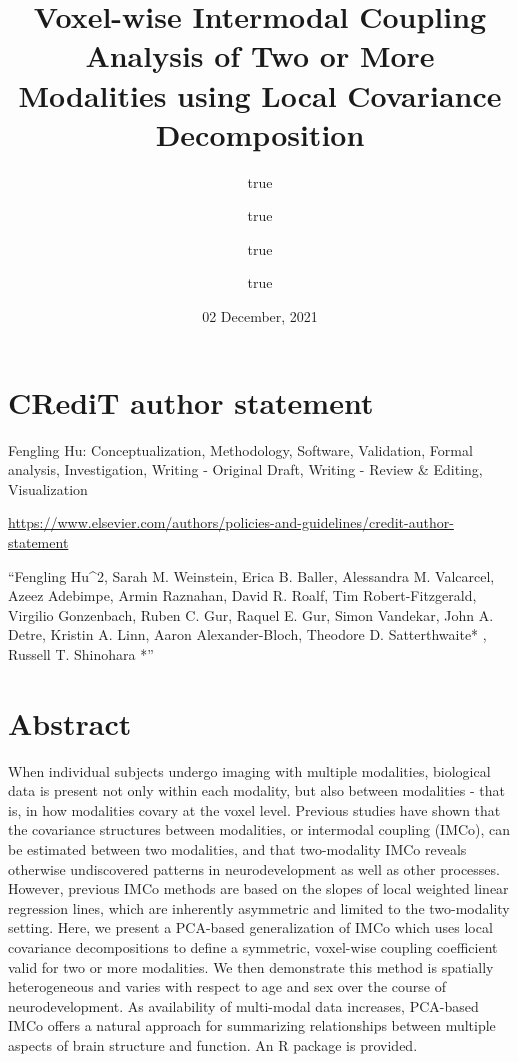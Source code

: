 \documentclass[
  12pt,
]{article}
\title{Voxel-wise Intermodal Coupling Analysis of Two or More Modalities using Local Covariance Decomposition}
\author{true \and true \and true \and true}
\date{02 December, 2021}
\begin{document}
\maketitle

{
\setcounter{tocdepth}{2}
\tableofcontents
}
\hypertarget{credit-author-statement}{%
\section{CRediT author statement}\label{credit-author-statement}}

Fengling Hu: Conceptualization, Methodology, Software, Validation, Formal analysis, Investigation, Writing - Original Draft, Writing - Review \& Editing, Visualization

\url{https://www.elsevier.com/authors/policies-and-guidelines/credit-author-statement}

``Fengling Hu\^{}2, Sarah M. Weinstein, Erica B. Baller, Alessandra M. Valcarcel, Azeez Adebimpe, Armin Raznahan, David R. Roalf, Tim Robert-Fitzgerald, Virgilio Gonzenbach, Ruben C. Gur, Raquel E. Gur, Simon Vandekar, John A. Detre, Kristin A. Linn, Aaron Alexander-Bloch, Theodore D. Satterthwaite* , Russell T. Shinohara *''

\hypertarget{abstract}{%
\section{Abstract}\label{abstract}}

When individual subjects undergo imaging with multiple modalities, biological data is present not only within each modality, but also between modalities - that is, in how modalities covary at the voxel level. Previous studies have shown that the covariance structures between modalities, or intermodal coupling (IMCo), can be estimated between two modalities, and that two-modality IMCo reveals otherwise undiscovered patterns in neurodevelopment as well as other processes. However, previous IMCo methods are based on the slopes of local weighted linear regression lines, which are inherently asymmetric and limited to the two-modality setting. Here, we present a PCA-based generalization of IMCo which uses local covariance decompositions to define a symmetric, voxel-wise coupling coefficient valid for two or more modalities. We then demonstrate this method is spatially heterogeneous and varies with respect to age and sex over the course of neurodevelopment. As availability of multi-modal data increases, PCA-based IMCo offers a natural approach for summarizing relationships between multiple aspects of brain structure and function. An R package is provided.
\end{document}
